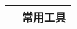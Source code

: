 \centering
\begin{tabular}{lll}
  \toprule
  & \multicolumn{2}{c}{常用工具} \\
  \cmidrule{2-3}
  
  \midrule
  
  
  
  
  \bottomrule
\end{tabular}

